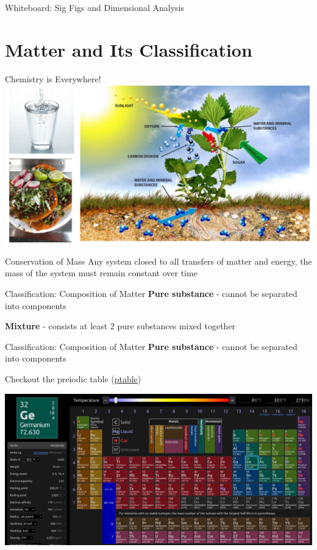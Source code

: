 \documentclass[11pt]{beamer}
\begin{document}
\begin{frame}{Whiteboard: Sig Figs and Dimensional Analysis}
\end{frame}

\section{Matter and Its Classification}

\begin{frame}{Chemistry is Everywhere!}
  \centering
  \includegraphics[width=1\linewidth]{food_pic}
\end{frame}

\begin{frame}{Conservation of Mass}
  Any system closed to all transfers of matter and energy, the mass
  of the system must remain constant over time
\end{frame}

\begin{frame}{Classification: Composition of Matter}
  \textbf{Pure substance} - cannot be separated into components

  \textbf{Mixture} - consists at least 2 pure substances mixed
  together
\end{frame}

\begin{frame}{Classification: Composition of Matter}
  \textbf{Pure substance} - cannot be separated into components
  
  Checkout the preiodic table (\href{https://ptable.com}{ptable})
  
  \centering
  \includegraphics[width=\linewidth]{ptable}
\end{frame}
\end{document}
